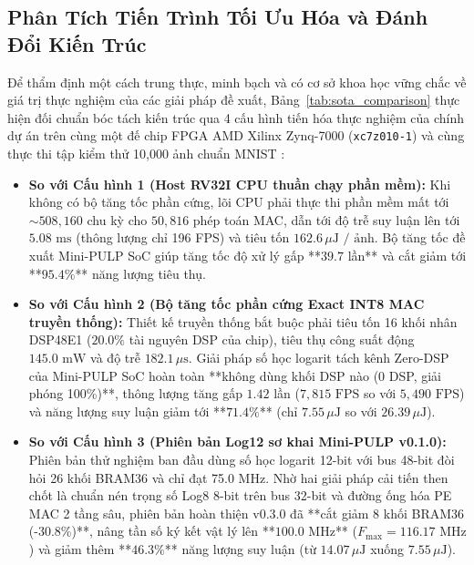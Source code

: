 \documentclass[conference]{IEEEtran}
\begin{document}
\subsection{Phân Tích Tiến Trình Tối Ưu Hóa và Đánh Đổi Kiến Trúc}
\hspace*{1em} Để thẩm định một cách trung thực, minh bạch và có cơ sở khoa học vững chắc về giá trị thực nghiệm của các giải pháp đề xuất, Bảng~\ref{tab:sota_comparison} thực hiện đối chuẩn bóc tách kiến trúc qua 4 cấu hình tiến hóa thực nghiệm của chính dự án trên cùng một đế chip FPGA AMD Xilinx Zynq-7000 (\texttt{xc7z010-1}) và cùng thực thi tập kiểm thử 10,000 ảnh chuẩn MNIST \cite{lecun1998}:
\begin{itemize}
    \item \textbf{So với Cấu hình 1 (Host RV32I CPU thuần chạy phần mềm):} Khi không có bộ tăng tốc phần cứng, lõi CPU phải thực thi phần mềm mất tới $\sim 508,160$ chu kỳ cho $50,816$ phép toán MAC, dẫn tới độ trễ suy luận lên tới $5.08\text{ ms}$ (thông lượng chỉ 196 FPS) và tiêu tốn $162.6\,\mu\text{J / ảnh}$. Bộ tăng tốc đề xuất Mini-PULP SoC giúp tăng tốc độ xử lý gấp **$39.7$ lần** và cắt giảm tới **$95.4\%$** năng lượng tiêu thụ.
    \item \textbf{So với Cấu hình 2 (Bộ tăng tốc phần cứng Exact INT8 MAC truyền thống):} Thiết kế truyền thống bắt buộc phải tiêu tốn 16 khối nhân DSP48E1 ($20.0\%$ tài nguyên DSP của chip), tiêu thụ công suất động $145.0\text{ mW}$ và độ trễ $182.1\,\mu\text{s}$. Giải pháp số học logarit tách kênh Zero-DSP của Mini-PULP SoC hoàn toàn **không dùng khối DSP nào (0 DSP, giải phóng 100\%)**, thông lượng tăng gấp $1.42$ lần ($7,815\text{ FPS}$ so với $5,490\text{ FPS}$) và năng lượng suy luận giảm tới **$71.4\%$** (chỉ $7.55\,\mu\text{J}$ so với $26.39\,\mu\text{J}$).
    \item \textbf{So với Cấu hình 3 (Phiên bản Log12 sơ khai Mini-PULP v0.1.0):} Phiên bản thử nghiệm ban đầu dùng số học logarit 12-bit với bus 48-bit đòi hỏi 26 khối BRAM36 và chỉ đạt 75.0 MHz. Nhờ hai giải pháp cải tiến then chốt là chuẩn nén trọng số Log8 8-bit trên bus 32-bit và đường ống hóa PE MAC 2 tầng sâu, phiên bản hoàn thiện v0.3.0 đã **cắt giảm 8 khối BRAM36 (-30.8\%)**, nâng tần số ký kết vật lý lên **$100.0\text{ MHz}$** ($F_{\max} = 116.17\text{ MHz}$) và giảm thêm **$46.3\%$** năng lượng suy luận (từ $14.07\,\mu\text{J}$ xuống $7.55\,\mu\text{J}$).
\end{itemize}
\end{document}
